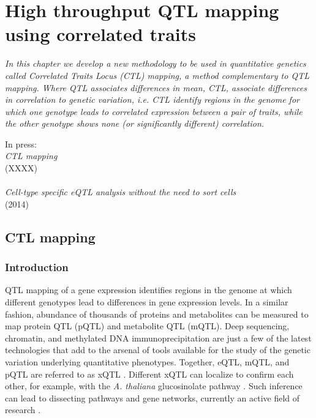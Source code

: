 \chapter{High throughput QTL mapping using correlated traits}
\thispagestyle{empty}
\label{chap:ctlmapping}

\emph{In this chapter we develop a new methodology to be used in quantitative genetics 
called Correlated Traits Locus (CTL) mapping, a method complementary to QTL mapping. 
Where QTL associates differences in mean, CTL, associate differences in correlation to 
genetic variation, i.e. CTL identify regions in the genome for which one genotype leads 
to correlated expression between a pair of traits, while the other genotype shows none 
(or significantly different) correlation.}

\null
\vfill

\begin{myexampleblock}{In press:}
  \\
  \emph{CTL mapping}\\
   (XXXX)\\

  \\
  \emph{Cell-type specific eQTL analysis without the need to sort cells}\\
   (2014)
\end{myexampleblock}

\newpage
\section{CTL mapping}
\subsection{Introduction}
  QTL mapping of a gene expression identifies regions in the genome at which different genotypes lead to differences in gene
  expression levels. In a similar fashion, abundance of thousands of proteins and metabolites can be measured to map protein 
  QTL (pQTL) and metabolite QTL (mQTL). 
  Deep sequencing, chromatin, and methylated DNA immunoprecipitation are just a few of the latest technologies that add to 
  the arsenal of tools available for the study of the genetic variation underlying quantitative phenotypes. Together, eQTL, 
  mQTL, and pQTL are referred to as xQTL \cite{Arends:2012}. Different xQTL can localize to confirm each other, for example, 
  with the \emph{A. thaliana} glucosinolate pathway \cite{Jansen:2009}. Such inference can lead to dissecting pathways and gene networks, 
  currently an active field of research \cite{Prins:2012}.

